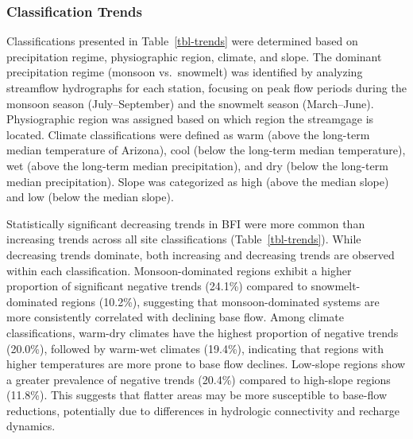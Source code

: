 \documentclass[
]{agujournal2019}
\begin{document}
\subsubsection{Classification Trends}\label{classification-trends}

Classifications presented in Table~\ref{tbl-trends} were determined
based on precipitation regime, physiographic region, climate, and slope.
The dominant precipitation regime (monsoon vs.~snowmelt) was identified
by analyzing streamflow hydrographs for each station, focusing on peak
flow periods during the monsoon season (July--September) and the
snowmelt season (March--June). Physiographic region was assigned based
on which region the streamgage is located. Climate classifications were
defined as warm (above the long-term median temperature of Arizona),
cool (below the long-term median temperature), wet (above the long-term
median precipitation), and dry (below the long-term median
precipitation). Slope was categorized as high (above the median slope)
and low (below the median slope).

Statistically significant decreasing trends in BFI were more common than
increasing trends across all site classifications
(Table~\ref{tbl-trends}). While decreasing trends dominate, both
increasing and decreasing trends are observed within each
classification. Monsoon-dominated regions exhibit a higher proportion of
significant negative trends (24.1\%) compared to snowmelt-dominated
regions (10.2\%), suggesting that monsoon-dominated systems are more
consistently correlated with declining base flow. Among climate
classifications, warm-dry climates have the highest proportion of
negative trends (20.0\%), followed by warm-wet climates (19.4\%),
indicating that regions with higher temperatures are more prone to base
flow declines. Low-slope regions show a greater prevalence of negative
trends (20.4\%) compared to high-slope regions (11.8\%). This suggests
that flatter areas may be more susceptible to base-flow reductions,
potentially due to differences in hydrologic connectivity and recharge
dynamics.
\end{document}

